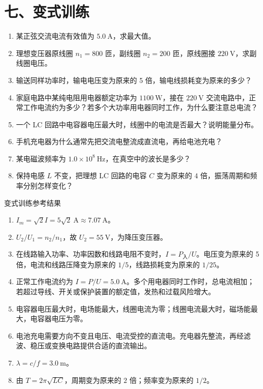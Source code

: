 \section*{七、变式训练}

\begin{enumerate}
  \item 某正弦交流电流有效值为 $5.0\ \mathrm{A}$，求最大值。
  \item 理想变压器原线圈 $n_1=800$ 匝，副线圈 $n_2=200$ 匝，原线圈接 $220\ \mathrm{V}$，求副线圈电压。
  \begin{center}
  
  \end{center}
  \item 输送同样功率时，输电电压变为原来的 5 倍，输电线损耗变为原来的多少？
  \begin{center}
  
  \end{center}
  \item 家庭电路中某纯电阻用电器额定功率为 $1100\ \mathrm{W}$，接在 $220\ \mathrm{V}$ 交流电路中，正常工作电流约为多少？若多个大功率用电器同时工作，为什么要注意总电流？
  \item 一个 LC 回路中电容器电压最大时，线圈中的电流是否最大？说明能量分布。
  \item 手机充电器为什么通常先把交流电整流成直流电，再给电池充电？
  \item 某电磁波频率为 $1.0\times10^8\ \mathrm{Hz}$，在真空中的波长是多少？
  \item 保持电感 $L$ 不变，把理想 LC 回路的电容 $C$ 变为原来的 $4$ 倍，振荡周期和频率分别怎样变化？
\end{enumerate}

\begin{learningbox}{变式训练参考结果}
\begin{enumerate}[itemsep=0.45em,topsep=0.3em,parsep=0pt]
  \item $I_m=\sqrt2I=5\sqrt2\ \mathrm A\approx7.07\ \mathrm A$。
  \item $U_2/U_1=n_2/n_1$，故 $U_2=55\ \mathrm V$，为降压变压器。
  \item 在线路输入功率、功率因数和线路电阻不变时，$I=P_{\text{入}}/U$。电压变为原来的 5 倍，电流和线路压降变为原来的 $1/5$，线路损耗变为原来的 $1/25$。
  \item 正常工作电流约为 $I=P/U=5.0\ \mathrm A$。多个用电器同时工作时，总电流相加；若超过导线、开关或保护装置的额定值，发热和过载风险增大。
  \item 电容器电压最大时，电场能最大，线圈电流为零；线圈电流最大时，磁场能最大，电容器电压为零。
  \item 电池充电需要方向不变且电压、电流受控的直流电。充电器先整流，再经滤波、稳压或变换电路提供合适的直流输出。
  \item $\lambda=c/f=3.0\ \mathrm m$。
  \item 由 $T=2\pi\sqrt{LC}$，周期变为原来的 $2$ 倍；频率变为原来的 $1/2$。
\end{enumerate}
\end{learningbox}

